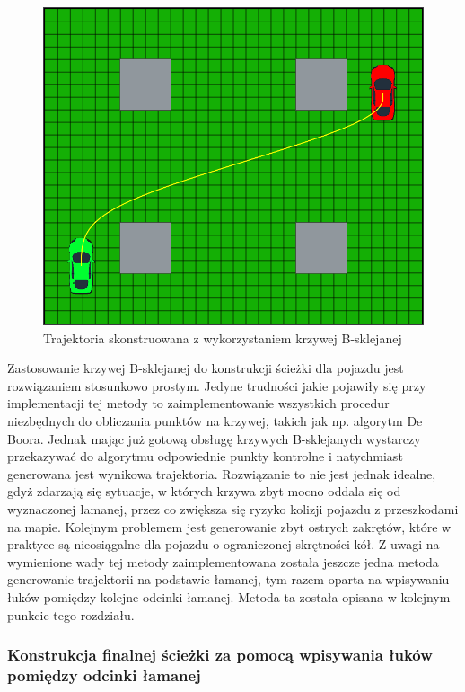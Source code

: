 \documentclass[a4paper,11pt,twoside]{report}
\theoremstyle{definition}
\begin{document}
\begin{figure}[h!]
\centering
\includegraphics[scale=0.4]{finalPathBSpline}
\caption[Trajektoria skonstruowana z wykorzystaniem krzywej B-sklejanej]{Trajektoria skonstruowana z wykorzystaniem krzywej B-sklejanej}
\end{figure}

Zastosowanie krzywej B-sklejanej do konstrukcji ścieżki dla pojazdu jest rozwiązaniem stosunkowo prostym. Jedyne trudności jakie pojawiły się przy implementacji tej metody to zaimplementowanie wszystkich procedur niezbędnych do obliczania punktów na krzywej, takich jak np. algorytm De Boora. Jednak mając już gotową obsługę krzywych B-sklejanych wystarczy przekazywać do algorytmu odpowiednie punkty kontrolne i natychmiast generowana jest wynikowa trajektoria. Rozwiązanie to nie jest jednak idealne, gdyż zdarzają się sytuacje, w których krzywa zbyt mocno oddala się od wyznaczonej łamanej, przez co zwiększa się ryzyko kolizji pojazdu z przeszkodami na mapie. Kolejnym problemem jest generowanie zbyt ostrych zakrętów, które w praktyce są nieosiągalne dla pojazdu o ograniczonej skrętności kół. Z uwagi na wymienione wady tej metody zaimplementowana została jeszcze jedna metoda generowanie trajektorii na podstawie łamanej, tym razem oparta na wpisywaniu łuków pomiędzy kolejne odcinki łamanej. Metoda ta została opisana w kolejnym punkcie tego rozdziału.

\subsubsection{Konstrukcja finalnej ścieżki za pomocą wpisywania łuków pomiędzy odcinki łamanej}
\end{document}
